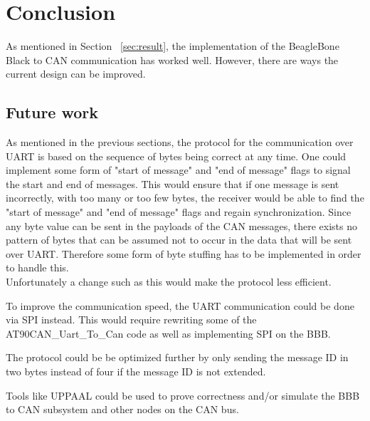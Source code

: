 
\section{Conclusion}\label{sec:conclusion}
As mentioned in Section ~\ref{sec:result}, the implementation of the BeagleBone Black to CAN communication has worked well. However, there are ways the current design can be improved.

\subsection{Future work}
As mentioned in the previous sections, the protocol for the communication over UART is based on the sequence of bytes being correct at any time. One could implement some form of "start of message" and "end of message" flags to signal the start and end of messages. This would ensure that if one message is sent incorrectly, with too many or too few bytes, the receiver would be able to find the "start of message" and "end of message" flags and regain synchronization. \newline
Since any byte value can be sent in the payloads of the CAN messages, there exists no pattern of bytes that can be assumed not to occur in the data that will be sent over UART. Therefore some form of byte stuffing has to be implemented in order to handle this. \\
Unfortunately a change such as this would make the protocol less efficient.

To improve the communication speed, the UART communication could be done via SPI instead. This would require rewriting some of the AT90CAN\_Uart\_To\_Can code as well as implementing SPI on the BBB.

The protocol could be be optimized further by only sending the message ID in two bytes instead of four if the message ID is not extended.

Tools like UPPAAL could be used to prove correctness and/or simulate the BBB to CAN subsystem and other nodes on the CAN bus.
